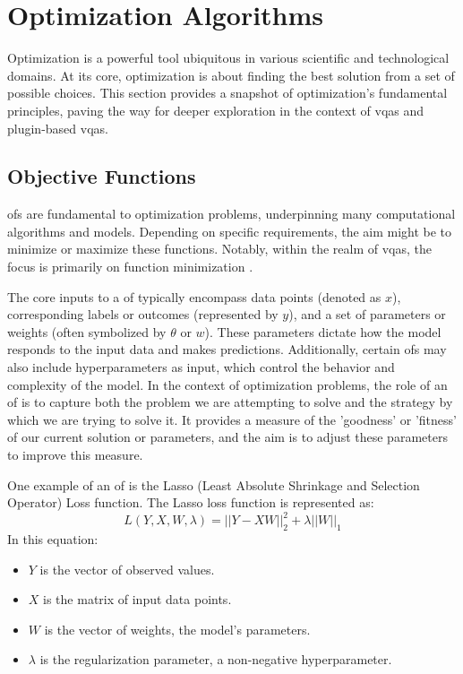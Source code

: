 \documentclass[
  a4paper,  %
  twoside,  %
  bibliography=totoc,
  headsepline,
  cleardoublepage=empty,
  parskip=half,
  draft=false
]{scrbook}
\begin{document}
\section{Optimization Algorithms}
\label{sec:optimizationAlgorithms}
Optimization is a powerful tool ubiquitous in various scientific and technological domains.
At its core, optimization is about finding the best solution from a set of possible choices.
This section provides a snapshot of optimization's fundamental principles, paving the way for deeper exploration in the context of \glspl{vqa} and plugin-based \glspl{vqa}.

\subsection{Objective Functions}
\label{subsec:objectiveFunctions}
\glspl{of} are fundamental to optimization problems, underpinning many computational algorithms and models.
Depending on specific requirements, the aim might be to minimize or maximize these functions.
Notably, within the realm of \glspl{vqa}, the focus is primarily on function minimization \cite{Weinan2017}.

The core inputs to a \gls{of} typically encompass data points (denoted as $x$), corresponding labels or outcomes (represented by $y$), and a set of parameters or weights (often symbolized by $\theta$ or $w$).
These parameters dictate how the model responds to the input data and makes predictions.
Additionally, certain \glspl{of} may also include hyperparameters as input, which control the behavior and complexity of the model.
In the context of optimization problems, the role of an \gls{of} is to capture both the problem we are attempting to solve and the strategy by which we are trying to solve it.
It provides a measure of the 'goodness' or 'fitness' of our current solution or parameters, and the aim is to adjust these parameters to improve this measure.

One example of an \gls{of} is the Lasso (Least Absolute Shrinkage and Selection Operator) Loss function.
The Lasso loss function is represented as:
\[
L(Y, X, W, \lambda) = ||Y - XW||^2_2 + \lambda ||W||_1
\]
In this equation:

\begin{itemize}
  \item \(Y\) is the vector of observed values.
  \item \(X\) is the matrix of input data points.
  \item \(W\) is the vector of weights, the model's parameters.
  \item \(\lambda\) is the regularization parameter, a non-negative hyperparameter.
\end{itemize}
\end{document}

